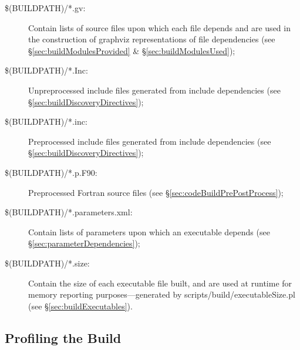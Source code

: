 \begin{description}
\item[{\normalfont \ttfamily \$(BUILDPATH)/*.gv}:] Contain lists of source files upon which each file depends and are used in the construction of \gls{graphviz} representations of file dependencies (see \S\ref{sec:buildModulesProvided} \& \S\ref{sec:buildModulesUsed});

\item[{\normalfont \ttfamily \$(BUILDPATH)/*.Inc}:] Unpreprocessed include files generated from {\normalfont \ttfamily include} dependencies (see \S\ref{sec:buildDiscoveryDirectives});

\item[{\normalfont \ttfamily \$(BUILDPATH)/*.inc}:] Preprocessed include files generated from {\normalfont \ttfamily include} dependencies (see \S\ref{sec:buildDiscoveryDirectives});

\item[{\normalfont \ttfamily \$(BUILDPATH)/*.p.F90}:] Preprocessed Fortran source files (see \S\ref{sec:codeBuildPrePostProcess});

\item[{\normalfont \ttfamily \$(BUILDPATH)/*.parameters.xml}:] Contain lists of parameters upon which an executable depends (see \S\ref{sec:parameterDependencies});

\item[{\normalfont \ttfamily \$(BUILDPATH)/*.size}:] Contain the size of each executable file built, and are used at runtime for memory reporting purposes---generated by {\normalfont \ttfamily scripts/build/executableSize.pl} (see \S\ref{sec:buildExecutables}).
\end{description}

\subsection{Profiling the Build}

